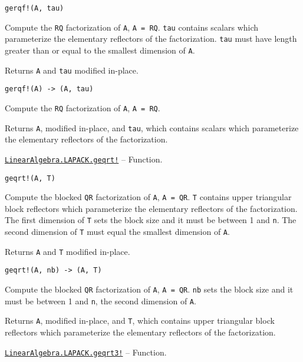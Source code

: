 \begin{adjustwidth}{2em}{0pt}


\begin{verbatim}
gerqf!(A, tau)
\end{verbatim}

Compute the \texttt{RQ} factorization of \texttt{A}, \texttt{A = RQ}. \texttt{tau} contains scalars which parameterize the elementary reflectors of the factorization. \texttt{tau} must have length greater than or equal to the smallest dimension of \texttt{A}.

Returns \texttt{A} and \texttt{tau} modified in-place.




\begin{lstlisting}
gerqf!(A) -> (A, tau)
\end{lstlisting}

Compute the \texttt{RQ} factorization of \texttt{A}, \texttt{A = RQ}.

Returns \texttt{A}, modified in-place, and \texttt{tau}, which contains scalars which parameterize the elementary reflectors of the factorization.



\end{adjustwidth}
\hypertarget{6324071823423584289}{} 
\hyperlink{6324071823423584289}{\texttt{LinearAlgebra.LAPACK.geqrt!}}  -- {Function.}

\begin{adjustwidth}{2em}{0pt}


\begin{verbatim}
geqrt!(A, T)
\end{verbatim}

Compute the blocked \texttt{QR} factorization of \texttt{A}, \texttt{A = QR}. \texttt{T} contains upper triangular block reflectors which parameterize the elementary reflectors of the factorization. The first dimension of \texttt{T} sets the block size and it must be between 1 and \texttt{n}. The second dimension of \texttt{T} must equal the smallest dimension of \texttt{A}.

Returns \texttt{A} and \texttt{T} modified in-place.




\begin{lstlisting}
geqrt!(A, nb) -> (A, T)
\end{lstlisting}

Compute the blocked \texttt{QR} factorization of \texttt{A}, \texttt{A = QR}. \texttt{nb} sets the block size and it must be between 1 and \texttt{n}, the second dimension of \texttt{A}.

Returns \texttt{A}, modified in-place, and \texttt{T}, which contains upper triangular block reflectors which parameterize the elementary reflectors of the factorization.



\end{adjustwidth}
\hypertarget{12471188723051727334}{} 
\hyperlink{12471188723051727334}{\texttt{LinearAlgebra.LAPACK.geqrt3!}}  -- {Function.}

